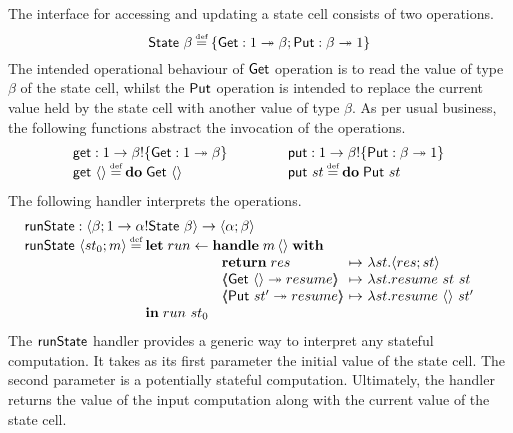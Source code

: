 \documentclass[12pt,phd,lfcs,twoside,openright,logo,leftchapter,normalheadings]{infthesis}
\theoremstyle{plain}
\theoremstyle{definition}
\begin{document}
The interface for accessing and updating a state cell consists of two
operations.
%
\[
  \State~\beta \defas \{\Get:\UnitType \opto \beta;\Put:\beta \opto \UnitType\}
\]
%
The intended operational behaviour of $\mathsf{Get}$ operation is to read the
value of type $\beta$ of the state cell, whilst the $\mathsf{Put}$ operation
is intended to replace the current value held by the state cell with
another value of type $\beta$. As per usual business, the following
functions abstract the invocation of the operations.
%
\[
  \ba{@{~}l@{\quad\qquad\quad}c@{~}l}
    \Uget : \UnitType \to \beta \eff \{\Get:\UnitType \opto \beta\}
    & &
    \Uput : \UnitType \to \beta \eff \{\Put:\beta \opto \UnitType\}\\
    \Uget~\Unit \defas \Do\;\Get~\Unit
    & &
    \Uput~st \defas \Do\;\Put~st
  \el
\]
%
The following handler interprets the operations.
%
\[
  \bl
    \runState : \Record{\beta;\UnitType \to \alpha \eff \State~\beta} \to \Record{\alpha;\beta}\\
    \runState~\Record{st_0;m} \defas
        \ba[t]{@{}l}
           \Let\;run \revto
              \ba[t]{@{}l}
                \Handle\;m\,\Unit\;\With\\
                 ~\ba{@{~}l@{~}c@{~}l}
                   \Return\;res      &\mapsto& \lambda st.\Record{res;st}\\
                   \OpCase{\Get}{\Unit}{resume} &\mapsto& \lambda st.resume~st~st\\
                   \OpCase{\Put}{st'}{resume}   &\mapsto& \lambda st.resume~\Unit~st'
                  \ea
              \ea\\
           \In\;run~st_0
        \ea
  \el
\]
%
The $\mathsf{runState}$ handler provides a generic way to interpret any
stateful computation. It takes as its first parameter the initial
value of the state cell. The second parameter is a potentially
stateful computation. Ultimately, the handler returns the value of the
input computation along with the current value of the state cell.
\end{document}
